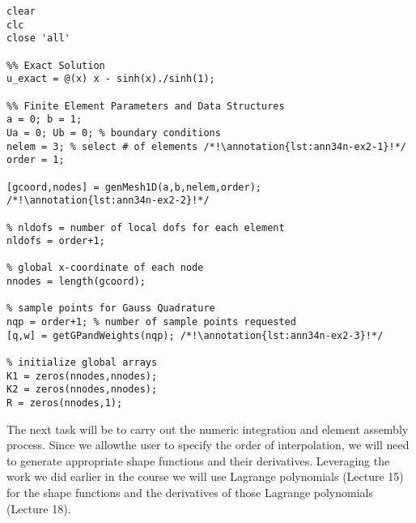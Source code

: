 \begin{lstlisting}[style=myMatlab,name=lec34n-ex2]
clear
clc
close 'all'

%% Exact Solution
u_exact = @(x) x - sinh(x)./sinh(1);

%% Finite Element Parameters and Data Structures
a = 0; b = 1;
Ua = 0; Ub = 0; % boundary conditions
nelem = 3; % select # of elements /*!\annotation{lst:ann34n-ex2-1}!*/
order = 1;

[gcoord,nodes] = genMesh1D(a,b,nelem,order); /*!\annotation{lst:ann34n-ex2-2}!*/

% nldofs = number of local dofs for each element
nldofs = order+1;

% global x-coordinate of each node
nnodes = length(gcoord);

% sample points for Gauss Quadrature
nqp = order+1; % number of sample points requested
[q,w] = getGPandWeights(nqp); /*!\annotation{lst:ann34n-ex2-3}!*/

% initialize global arrays
K1 = zeros(nnodes,nnodes);
K2 = zeros(nnodes,nnodes);
R = zeros(nnodes,1);
\end{lstlisting}
The next task will be to carry out the numeric integration and element assembly process.  Since we allowthe user to specify the order of interpolation, we will need to generate appropriate shape functions and their derivatives.  Leveraging the work we did earlier in the course we will use Lagrange polynomials (Lecture 15) for the shape functions and the derivatives of those Lagrange polynomials (Lecture 18).
